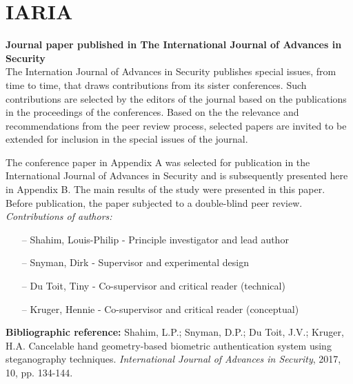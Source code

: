 
\chapter{IARIA}
\label{AppendixB}
\textbf{Journal paper published in The International Journal of Advances in Security} \\

The Internation Journal of Advances in Security publishes special issues, from time to time, that draws contributions from its sister conferences. Such contributions are selected by the editors of the journal based on the publications in the proceedings of the conferences. Based on the the relevance and recommendations from the peer review process, selected papers are invited to be extended for inclusion in the special issues of the journal.

The conference paper in Appendix A was selected for publication in the International Journal of Advances in Security and is subsequently presented here in Appendix B. The main results of the study were presented in this paper. Before publication, the paper subjected to a double-blind peer review.\\

\textit{Contributions of authors:}
\begin{itemize}
    \item[--] Shahim, Louis-Philip - Principle investigator and lead author
    \item[--] Snyman, Dirk - Supervisor and experimental design
    \item[--] Du Toit, Tiny - Co-supervisor and critical reader (technical)
    \item[--] Kruger, Hennie - Co-supervisor and critical reader (conceptual)
\end{itemize}

\textbf{Bibliographic reference:} Shahim, L.P.; Snyman, D.P.; Du Toit, J.V.; Kruger, H.A. Cancelable hand geometry-based biometric authentication system using steganography techniques. \textit{International Journal of Advances in Security}, 2017, 10, pp. 134-144.



